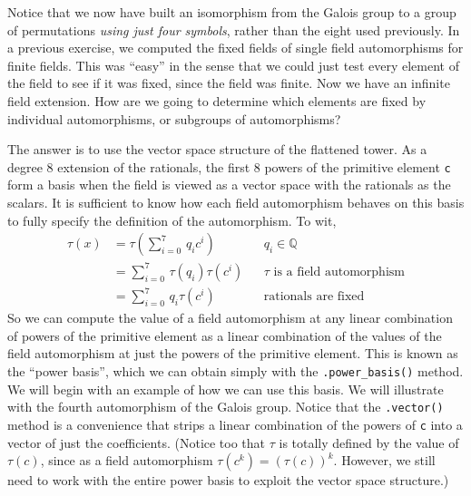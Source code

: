 %
Notice that we now have built an isomorphism from the Galois group to a group of permutations \emph{using just four symbols}, rather than the eight used previously.
%
%
In a previous exercise, we computed the fixed fields of single field automorphisms for finite fields.  This was ``easy'' in the sense that we could just test every element of the field to see if it was fixed, since the field was finite.  Now we have an infinite field extension.  How are we going to determine which elements are fixed by individual automorphisms, or subgroups of automorphisms?\par
%
The answer is to use the vector space structure of the flattened tower.  As a degree 8 extension of the rationals, the first 8 powers of the primitive element \verb?c? form a basis when the field is viewed as a vector space with the rationals as the scalars.  It is sufficient to know how each field automorphism behaves on this basis to fully specify the definition of the automorphism.  To wit,
%
\begin{align*}
\tau(x)
&=\tau\left(\sum_{i=0}^7\,q_ic^i\right)&&q_i\in{\mathbb Q}\\
&=\sum_{i=0}^7\,\tau(q_i)\tau(c^i)&&\tau\text{ is a field automorphism}\\
&=\sum_{i=0}^7\,q_i\tau(c^i)&&\text{rationals are fixed}
\end{align*}
%
So we can compute the value of a field automorphism at any linear combination of powers of the primitive element as a linear combination of the values of the field automorphism at just the powers of the primitive element.  This is known as the ``power basis'', which we can obtain simply with the \verb?.power_basis()? method.  We will begin with an example of how we can use this basis.  We will illustrate with the fourth automorphism of the Galois group.  Notice that the \verb?.vector()? method is a convenience that strips a linear combination of the powers of \verb?c? into a vector of just the coefficients.  (Notice too that $\tau$ is totally defined by the value of $\tau(c)$, since as a field automorphism $\tau(c^k)=(\tau(c))^k$.  However, we still need to work with the entire power basis to exploit the vector space structure.)
%

